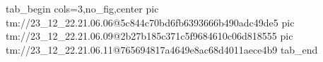  
 
 
 
 

\qqSecOrig


\ifcmt
  tab_begin cols=3,no_fig,center
    pic tm://23_12_22.21.06.06@5c844c70bd6fb6393666b490adc49de5
    pic tm://23_12_22.21.06.09@2b27b185c371c5f9684610c06d818555
    pic tm://23_12_22.21.06.11@765694817a4649e8ac68d4011aece4b9
  tab_end
\fi

